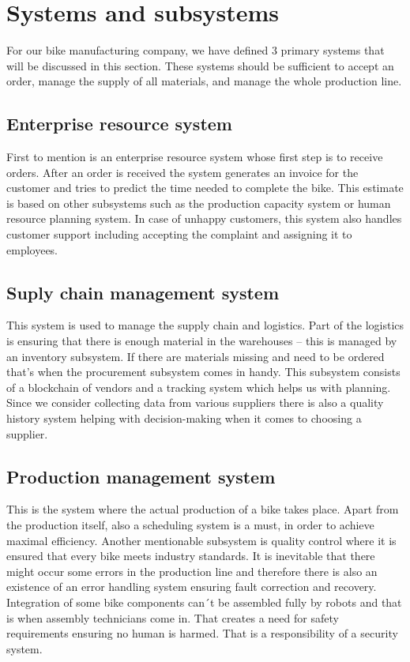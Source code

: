 \section{Systems and subsystems}
For our bike manufacturing company, we have defined 3 primary systems that will be discussed in this section. These systems should be sufficient to accept an order, manage the supply of all materials, and manage the whole production line.

\subsection{Enterprise resource system}
First to mention is an enterprise resource system whose first step is to receive orders. After an order is received the system generates an invoice for the customer and tries to predict the time needed to complete the bike. This estimate is based on other subsystems such as the production capacity system or human resource planning system. In case of unhappy customers, this system also handles customer support including accepting the complaint and assigning it to employees.

\subsection{Suply chain management system}
This system is used to manage the supply chain and logistics. Part of the logistics is ensuring that there is enough material in the warehouses -- this is managed by an inventory subsystem. If there are materials missing and need to be ordered that's when the procurement subsystem comes in handy. This subsystem consists of a blockchain of vendors and a tracking system which helps us with planning. Since we consider collecting data from various suppliers there is also a quality history system helping with decision-making when it comes to choosing a supplier.

\subsection{Production management system}
This is the system where the actual production of a bike takes place. Apart from the production itself, also a scheduling system is a must, in order to achieve maximal efficiency. Another mentionable subsystem is quality control where it is ensured that every bike meets industry standards. It is inevitable that there might occur some errors in the production line and therefore there is also an existence of an error handling system ensuring fault correction and recovery. Integration of some bike components can´t be assembled fully by robots and that is when assembly technicians come in. That creates a need for safety requirements ensuring no human is harmed. That is a responsibility of a security system.
